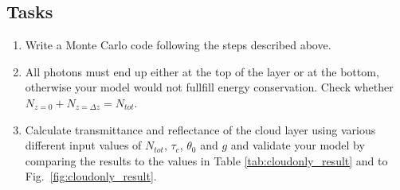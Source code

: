 \documentclass[12pt,twoside,a4paper]{article}
\begin{document}
\subsection{Tasks}
\begin{enumerate}
\item Write a Monte Carlo code following the steps described above.
\item All photons must end up either at the top of the layer or at the
  bottom, otherwise your model would not fullfill energy
  conservation. Check whether $N_{z=0}+N_{z=\Delta z}=N_{tot}$.
\item Calculate transmittance and reflectance of the cloud layer using
  various different input values of $N_{tot}$,
  $\tau_c$, $\theta_0$ and $g$ and validate your model by comparing
  the results to the values in Table \ref{tab:cloudonly_result} 
  and to Fig.~\ref{fig:cloudonly_result}.
\end{enumerate}
\end{document}
